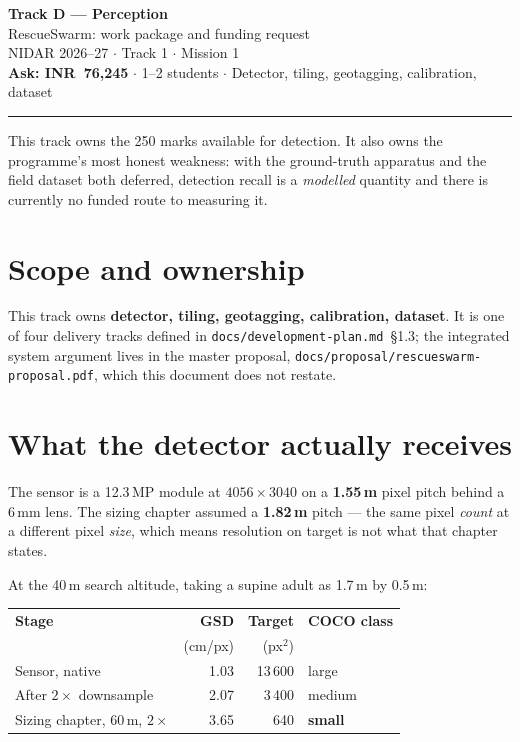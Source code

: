 \documentclass[11pt,a4paper]{article}
\newcommand{\inr}[1]{INR~#1}
\begin{document}
\begin{center}
{\LARGE\bfseries Track D --- Perception}\\[3mm]
{\large RescueSwarm: work package and funding request}\\[2mm]
NIDAR 2026--27 $\cdot$ Track 1 $\cdot$ Mission 1\\[1mm]
\textbf{Ask: \inr{76,245}} $\cdot$ 1--2 students $\cdot$ Detector, tiling, geotagging, calibration, dataset
\end{center}
\vspace{2mm}\hrule\vspace{4mm}


This track owns the 250 marks available for detection. It also owns the
programme's most honest weakness: with the ground-truth apparatus and the field
dataset both deferred, detection recall is a \emph{modelled} quantity and there
is currently no funded route to measuring it.

\section{Scope and ownership}

This track owns \textbf{detector, tiling, geotagging, calibration, dataset}. It is one of four delivery tracks defined in
\texttt{docs/development-plan.md}~\S1.3; the integrated system argument lives in
the master proposal, \texttt{docs/proposal/rescueswarm-proposal.pdf}, which this
document does not restate.

\section{What the detector actually receives}

The sensor is a 12.3\,MP module at $4056\times3040$ on a \textbf{1.55\,\textmu m}
pixel pitch behind a 6\,mm lens. The sizing chapter assumed a
\textbf{1.82\,\textmu m} pitch --- the same pixel \emph{count} at a different
pixel \emph{size}, which means resolution on target is not what that chapter
states.

At the 40\,m search altitude, taking a supine adult as 1.7\,m by 0.5\,m:

\begin{center}
\begin{tabular}{@{}lrrl@{}}
\toprule
\textbf{Stage} & \textbf{GSD} & \textbf{Target} & \textbf{COCO class} \\
 & (cm/px) & (px$^2$) & \\
\midrule
Sensor, native & 1.03 & 13\,600 & large \\
After $2\times$ downsample & 2.07 & 3\,400 & medium \\
Sizing chapter, 60\,m, $2\times$ & 3.65 & 640 & \textbf{small} \\
\bottomrule
\end{tabular}
\end{center}
\end{document}
